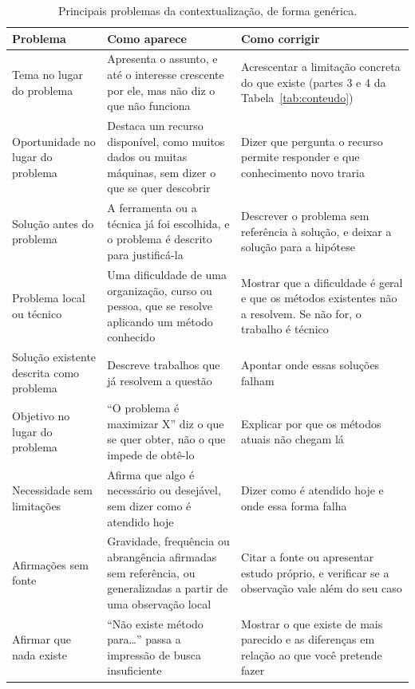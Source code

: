 \documentclass[10pt,a4paper]{extarticle}
\theoremstyle{definition}
\begin{document}
\begin{table}[!ht]
\centering
\small
\renewcommand{\arraystretch}{1.2}
\begin{tabularx}{\textwidth}{@{}l L L@{}}
\toprule
Problema & Como aparece & Como corrigir \\
\midrule
Tema no lugar do problema & Apresenta o assunto, e até o interesse crescente por ele, mas não diz o que não funciona & Acrescentar a limitação concreta do que existe (partes 3 e 4 da Tabela~\ref{tab:conteudo}) \\
Oportunidade no lugar do problema & Destaca um recurso disponível, como muitos dados ou muitas máquinas, sem dizer o que se quer descobrir & Dizer que pergunta o recurso permite responder e que conhecimento novo traria \\
Solução antes do problema & A ferramenta ou a técnica já foi escolhida, e o problema é descrito para justificá-la & Descrever o problema sem referência à solução, e deixar a solução para a hipótese \\
Problema local ou técnico & Uma dificuldade de uma organização, curso ou pessoa, que se resolve aplicando um método conhecido & Mostrar que a dificuldade é geral e que os métodos existentes não a resolvem. Se não for, o trabalho é técnico \\
Solução existente descrita como problema & Descreve trabalhos que já resolvem a questão & Apontar onde essas soluções falham \\
Objetivo no lugar do problema & \enquote{O problema é maximizar X} diz o que se quer obter, não o que impede de obtê-lo & Explicar por que os métodos atuais não chegam lá \\
Necessidade sem limitações & Afirma que algo é necessário ou desejável, sem dizer como é atendido hoje & Dizer como é atendido hoje e onde essa forma falha \\
Afirmações sem fonte & Gravidade, frequência ou abrangência afirmadas sem referência, ou generalizadas a partir de uma observação local & Citar a fonte ou apresentar estudo próprio, e verificar se a observação vale além do seu caso \\
Afirmar que nada existe & \enquote{Não existe método para\dots} passa a impressão de busca insuficiente & Mostrar o que existe de mais parecido e as diferenças em relação ao que você pretende fazer \\
\bottomrule
\end{tabularx}
\caption{Principais problemas da contextualização, de forma genérica.}
\label{tab:confusoes}
\end{table}
\end{document}
